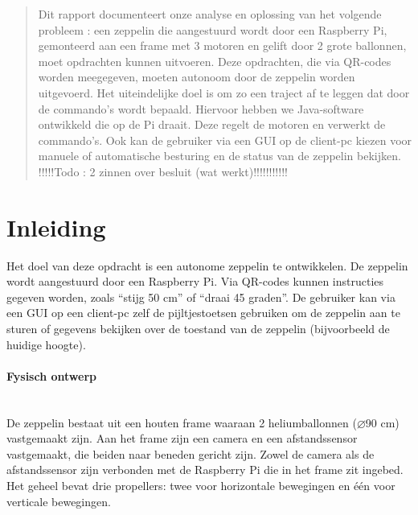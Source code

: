 \documentclass[eind]{penoverslag}
\begin{document}
\maketitlepage


\begin{abstract}
\noindent
Dit rapport documenteert onze analyse en oplossing van het volgende probleem : een zeppelin die aangestuurd wordt door een Raspberry Pi, gemonteerd aan een frame met 3 motoren en   gelift door 2 grote ballonnen, moet opdrachten kunnen uitvoeren. Deze opdrachten, die via QR-codes worden meegegeven, moeten autonoom door de zeppelin worden uitgevoerd. Het uiteindelijke doel is om zo een traject af te leggen dat door de commando's wordt bepaald. Hiervoor hebben we Java-software ontwikkeld die op de Pi draait. Deze regelt de motoren en verwerkt de commando's. Ook kan de gebruiker via een GUI op de client-pc kiezen voor manuele of automatische besturing en de status van de zeppelin bekijken. \\

!!!!!Todo : 2 zinnen over besluit (wat werkt)!!!!!!!!!!!
\end{abstract}


\tableofcontents\newpage


\section{Inleiding}
Het doel van deze opdracht is een autonome zeppelin te ontwikkelen. De zeppelin wordt aangestuurd door een Raspberry Pi. Via QR-codes kunnen instructies gegeven worden, zoals ``stijg 50 cm'' of ``draai 45   graden''. De gebruiker kan via een GUI op een client-pc zelf de pijltjestoetsen gebruiken om de zeppelin aan te sturen of gegevens bekijken over de toestand van de zeppelin (bijvoorbeeld de huidige hoogte).

\paragraph{Fysisch ontwerp}
~\\ 
De zeppelin bestaat uit een houten frame waaraan 2 heliumballonnen ($\diameter$90 cm) vastgemaakt zijn. Aan het frame zijn een camera en een afstandssensor vastgemaakt, die beiden naar beneden gericht zijn. Zowel de camera als de afstandssensor zijn verbonden met de Raspberry Pi die in het frame zit ingebed. Het geheel bevat drie propellers: twee voor horizontale bewegingen en \'{e}\'{e}n voor verticale bewegingen.
\end{document}
